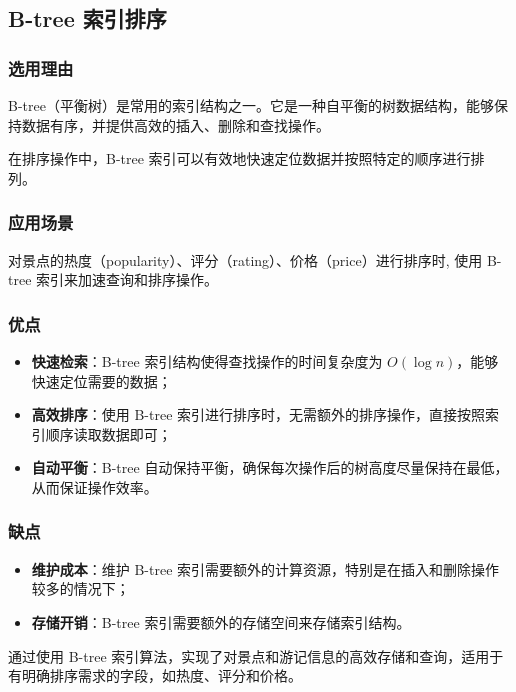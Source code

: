 \documentclass{ctexart}
\begin{document}
\subsection{B-tree 索引排序}

\subsubsection{选用理由}

B-tree（平衡树）是常用的索引结构之一。它是一种自平衡的树数据结构，能够保持数据有序，并提供高效的插入、删除和查找操作。

在排序操作中，B-tree 索引可以有效地快速定位数据并按照特定的顺序进行排列。

\subsubsection{应用场景}

对景点的热度（popularity）、评分（rating）、价格（price）进行排序时, 使用 B-tree 索引来加速查询和排序操作。

\subsubsection{优点}

\begin{itemize}
    \item \textbf{快速检索}：B-tree 索引结构使得查找操作的时间复杂度为 $O (\log n)$，能够快速定位需要的数据；
    \item \textbf{高效排序}：使用 B-tree 索引进行排序时，无需额外的排序操作，直接按照索引顺序读取数据即可；
    \item \textbf{自动平衡}：B-tree 自动保持平衡，确保每次操作后的树高度尽量保持在最低，从而保证操作效率。
\end{itemize}

\subsubsection{缺点}

\begin{itemize}
    \item \textbf{维护成本}：维护 B-tree 索引需要额外的计算资源，特别是在插入和删除操作较多的情况下；
    \item \textbf{存储开销}：B-tree 索引需要额外的存储空间来存储索引结构。
\end{itemize}

通过使用 B-tree 索引算法，实现了对景点和游记信息的高效存储和查询，适用于有明确排序需求的字段，如热度、评分和价格。
\end{document}
